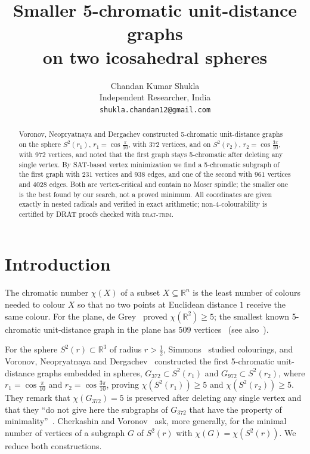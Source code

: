\documentclass[11pt]{article}
\title{Smaller 5-chromatic unit-distance graphs\\ on two icosahedral spheres}
\author{Chandan Kumar Shukla\\ {\small Independent Researcher, India}\\ {\small \texttt{shukla.chandan12@gmail.com}}}
\date{}
\theoremstyle{remark}
\begin{document}
\maketitle

\begin{abstract}
Voronov, Neopryatnaya and Dergachev constructed 5-chromatic unit-distance graphs on the sphere
$S^2(r_1)$, $r_1=\cos\frac{\pi}{10}$, with $372$ vertices, and on $S^2(r_2)$, $r_2=\cos\frac{3\pi}{10}$,
with $972$ vertices, and noted that the first graph stays 5-chromatic after deleting any single vertex. By
SAT-based vertex minimization we find a 5-chromatic subgraph of the first graph with $231$ vertices and
$938$ edges, and one of the second with $961$ vertices and $4028$ edges. Both are vertex-critical and
contain no Moser spindle; the smaller one is the best found by our search, not a proved minimum. All
coordinates are given exactly in nested radicals and verified in exact arithmetic;
non-4-colourability is certified by DRAT proofs checked with \textsc{drat-trim}.
\end{abstract}

\section{Introduction}

The chromatic number $\chi(X)$ of a subset $X\subseteq\mathbb{R}^n$ is the least number of colours needed
to colour $X$ so that no two points at Euclidean distance $1$ receive the same colour. For the plane, de
Grey~\cite{deGrey} proved $\chi(\mathbb{R}^2)\ge5$; the smallest known 5-chromatic unit-distance graph in
the plane has $509$ vertices~\cite{Parts1} (see also~\cite{Heule1}).

For the sphere $S^2(r)\subset\mathbb{R}^3$ of radius $r>\tfrac12$, Simmons~\cite{Simmons} studied
colourings, and Voronov, Neopryatnaya and Dergachev~\cite{VND2022} constructed the first 5-chromatic unit-distance
graphs embedded in spheres, $G_{372}\subset S^2(r_1)$ and $G_{972}\subset S^2(r_2)$, where
$r_1=\cos\frac{\pi}{10}$ and $r_2=\cos\frac{3\pi}{10}$, proving $\chi(S^2(r_1))\ge5$ and
$\chi(S^2(r_2))\ge5$. They remark that $\chi(G_{372})=5$ is preserved after deleting any single vertex
and that they ``do not give here the subgraphs of $G_{372}$ that have the property of
minimality''~\cite[Sect.~4]{VND2022}. Cherkashin and Voronov~\cite{CV2022} ask, more generally, for the
minimal number of vertices of a subgraph $G$ of $S^2(r)$ with $\chi(G)=\chi(S^2(r))$.
We reduce both constructions.
\end{document}
